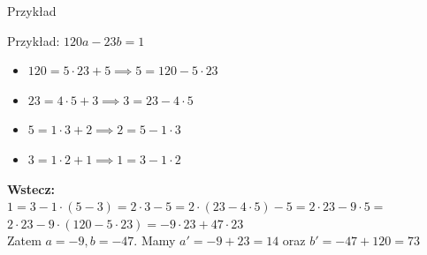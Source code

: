 \documentclass{beamer}
\begin{document}
\begin{frame}{Przykład}
    \begin{exampleblock}{Przykład: $120a - 23b = 1$}
        \begin{itemize}
            \item \(120 = 5\cdot 23 + 5 \implies 5 = 120 - 5 \cdot 23\)
            \item \(23 = 4 \cdot 5 + 3 \implies 3 = 23 - 4 \cdot 5\)
            \item \(5 = 1 \cdot 3 + 2 \implies 2 = 5 - 1 \cdot 3\)
            \item \(3 = 1 \cdot 2 + 1 \implies 1 = 3 - 1 \cdot 2\)
        \end{itemize}
        \textbf{Wstecz:}\\
        \(1 = 3 - 1 \cdot (5 - 3) = 2 \cdot 3 - 5 = 2 \cdot (23 - 4 \cdot 5) - 5 = 2 \cdot 23 - 9 \cdot 5 =\) \\
        \(2 \cdot 23 - 9 \cdot (120 - 5 \cdot 23) = -9 \cdot 23 + 47 \cdot 23\)\\
        Zatem $a=-9, b=-47$.
        Mamy \(a' = -9 + 23 = 14\) oraz \(b' = -47 + 120 = 73\)
    \end{exampleblock}

\end{frame}
\end{document}
